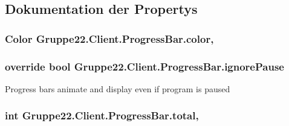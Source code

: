 \subsection{Dokumentation der Propertys}
\hypertarget{class_gruppe22_1_1_client_1_1_progress_bar_a0af6ea002815cac6dbc030d5fb1de81d}{
\subsubsection[{color}]{\setlength{\rightskip}{0pt plus 5cm}Color Gruppe22.\-Client.\-Progress\-Bar.\-color\hspace{0.3cm}{\ttfamily [get]}, {\ttfamily [set]}}}\label{class_gruppe22_1_1_client_1_1_progress_bar_a0af6ea002815cac6dbc030d5fb1de81d}
\hypertarget{class_gruppe22_1_1_client_1_1_progress_bar_ab1cf4a6b7055b48199edac21328ae1ed}{
\subsubsection[{ignore\-Pause}]{\setlength{\rightskip}{0pt plus 5cm}override bool Gruppe22.\-Client.\-Progress\-Bar.\-ignore\-Pause\hspace{0.3cm}{\ttfamily [get]}}}\label{class_gruppe22_1_1_client_1_1_progress_bar_ab1cf4a6b7055b48199edac21328ae1ed}


Progress bars animate and display even if program is paused 

\hypertarget{class_gruppe22_1_1_client_1_1_progress_bar_ae3302bc227446998679b7e4a0f67f9bb}{
\subsubsection[{total}]{\setlength{\rightskip}{0pt plus 5cm}int Gruppe22.\-Client.\-Progress\-Bar.\-total\hspace{0.3cm}{\ttfamily [get]}, {\ttfamily [set]}}}\label{class_gruppe22_1_1_client_1_1_progress_bar_ae3302bc227446998679b7e4a0f67f9bb}


